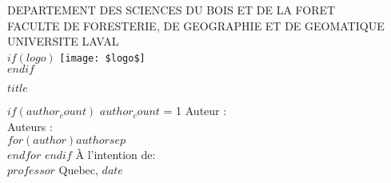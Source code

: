 
\begin{titlepage} 
    \centering
    {\large DEPARTEMENT DES SCIENCES DU BOIS ET DE LA FORET \\}
    {\large FACULTE DE FORESTERIE, DE GEOGRAPHIE ET DE GEOMATIQUE \\}
    {\large UNIVERSITE LAVAL \\}
    $if(logo)$ %
        \texttt{[image: \$logo\$]} \\
    $endif$
    \vfill %
    {\Huge\bfseries\underline {$title$} \par}
    \vfill %
    $if(author_count)$
        \ifnum $author_count$ = 1
            {\Large Auteur : \\}
        \else
            {\Large Auteurs : \\}
        \fi
        $for(author)${\large {$author$}}$sep$\\$endfor$
    $endif$
    \vfill
    {\Large À l'intention de: \\ {$professor$}}
    \vfill
    {\large Quebec, {$date$}}
\end{titlepage}
